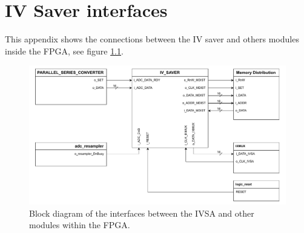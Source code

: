 \chapter{IV Saver interfaces} \label{App:IVSA_INTERFACE}
This appendix shows the connections between the IV saver and others modules inside the FPGA, see figure \ref{fig_App_IVSA_INTERFACE}.

\begin{figure}[H]
    \centering
    \includegraphics[clip, trim=0 0 0 0,width=1.0\textwidth]{Appendix/Figures/IVSA.pdf}
    \caption{Block diagram of the interfaces between the IVSA and other modules within the FPGA.}
    \label{fig_App_IVSA_INTERFACE}
\end{figure}

